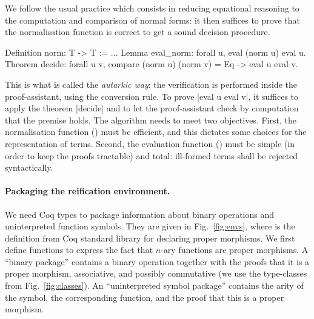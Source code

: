 \documentclass{llncs}
\begin{document}
We follow the usual practice which consists in reducing equational
reasoning to the computation and comparison of normal forms: it then
suffices to prove that the normalisation function is correct to get a
sound decision procedure.
\begin{twolistings}
\begin{coq}
Definition norm: T -> T := ...
Lemma eval_norm: forall u, eval (norm u) \equiv eval u.
Theorem decide: forall u v, compare (norm u) (norm v) = Eq -> eval u \equiv eval v.
\end{coq}
\end{twolistings}
\noindent
This is what is called the \emph{autarkic way}: the verification is
performed inside the proof-assistant, using the conversion rule. To
prove \coqinline|eval u \equiv eval v|, it suffices to apply the
theorem \coqinline|decide| and to let the proof-assistant check by
computation that the premise holds.
The algorithm needs to meet two objectives. First, the normalisation
function () must be efficient, and this dictates some
choices for the representation of terms. Second, the evaluation
function () must be simple (in order to keep the proofs
tractable) and total: ill-formed terms shall be rejected
syntactically.

\paragraph{Packaging the reification environment.}

We need Coq types to package information about binary operations and
uninterpreted function symbols. They are given in Fig.~\ref{fig:envs},
where  is the definition from Coq standard
library for declaring proper morphisms. We first define functions to
express the fact that $n$-ary functions are proper morphisms. A
``binary package'' contains a binary operation together with the
proofs that it is a proper morphism, associative, and possibly
commutative (we use the type-classes from Fig.~\ref{fig:classes}). An
``uninterpreted symbol package'' contains the arity of the symbol, the
corresponding function, and the proof that this is a proper morphism.
\end{document}
